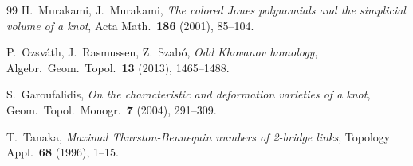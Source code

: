 \documentclass[12pt,a4paper]{amsart}
\theoremstyle{definition}
\theoremstyle{remark}
\begin{document}
\begin{thebibliography}{99}
H.~Murakami, J.~Murakami,
\textit{The colored Jones polynomials and the simplicial volume of a knot},
Acta Math.\ \textbf{186} (2001), 85--104.

P.~Ozsváth, J.~Rasmussen, Z.~Szabó,
\textit{Odd Khovanov homology},
Algebr.\ Geom.\ Topol.\ \textbf{13} (2013), 1465--1488.

S.~Garoufalidis,
\textit{On the characteristic and deformation varieties of a knot},
Geom.\ Topol.\ Monogr.\ \textbf{7} (2004), 291--309.

T.~Tanaka,
\textit{Maximal Thurston-Bennequin numbers of 2-bridge links},
Topology Appl.\ \textbf{68} (1996), 1--15.

\end{thebibliography}
\end{document}
